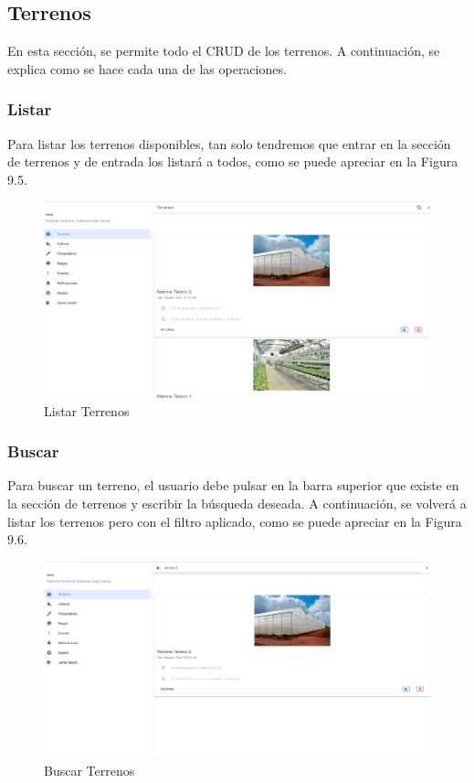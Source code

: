 \subsection{Terrenos}
En esta sección, se permite todo el CRUD de los terrenos. A continuación, se explica como se hace cada una de las operaciones.

\subsubsection{Listar}
Para listar los terrenos disponibles, tan solo tendremos que entrar en la sección de terrenos y de entrada los listará a todos, como se puede apreciar en la Figura 9.5.
\begin{figure}[H]
    \centering
    \includegraphics[width=0.7\linewidth]{images/user-manual/farmableland/list.png}
    \caption{Listar Terrenos}
\end{figure}

\subsubsection{Buscar}
Para buscar un terreno, el usuario debe pulsar en la barra superior que existe en la sección de terrenos y escribir la búsqueda deseada. A continuación, se volverá a listar los terrenos pero con el filtro aplicado, como se puede apreciar en la Figura 9.6.
\begin{figure}[H]
    \centering
    \includegraphics[width=0.7\linewidth]{images/user-manual/farmableland/search.png}
    \caption{Buscar Terrenos}
\end{figure}

